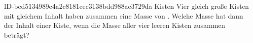 \begin{exercise}
      {ID-bcd5134989c4a2c8181cec3138bdd988ac3729da}
      {Kisten}
  \ifproblem\problem
    Vier gleich große Kisten mit gleichem Inhalt haben zusammen eine Masse
    von . Welche Masse hat dann der Inhalt einer Kiste, wenn die
    Masse aller vier leeren Kisten zusammen  beträgt?
  \fi
\end{exercise}
